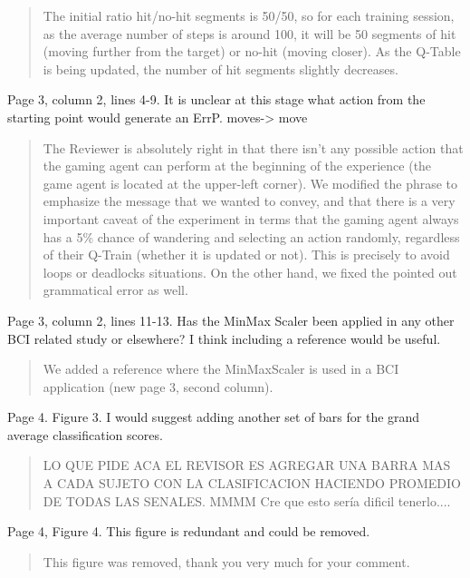 \documentclass[journal,onecolumn,12pt]{IEEEtran}
\begin{document}
\begin{quotation}
{\color{blue}
The initial ratio hit/no-hit segments is 50/50, so for each training session, as the average number of steps is around 100, it will be 50 segments of hit (moving further from the target) or no-hit (moving closer).  As the Q-Table is being updated, the number of hit segments slightly decreases.
}
\end{quotation}


Page 3, column 2, lines 4-9. It is unclear at this stage what action from the starting point would generate an ErrP.
moves-> move

\begin{quotation}
{\color{blue}
The Reviewer is absolutely right in that there isn't any possible action that the gaming agent can perform at the beginning of the experience (the game agent is located at the upper-left corner).  We modified the phrase to emphasize the message that we wanted to convey, and that there is a very important caveat of the experiment in terms that the gaming agent always has a 5\% chance of wandering and selecting an action randomly, regardless of their Q-Train (whether it is updated or not).  This is precisely to avoid loops or deadlocks situations.
On the other hand, we fixed the pointed out grammatical error as well.
}
\end{quotation}


Page 3, column 2, lines 11-13. Has the MinMax Scaler been applied in any other BCI related study or elsewhere? I think including a reference would be useful.

\begin{quotation}
{\color{blue}
We added a reference where the MinMaxScaler is used in a BCI application (new page 3, second column).
}
\end{quotation}

Page 4. Figure 3. I would suggest adding another set of bars for the grand average classification scores.

\begin{quotation}
{\color{blue}
LO QUE PIDE ACA EL REVISOR ES AGREGAR UNA BARRA MAS A CADA SUJETO CON LA CLASIFICACION HACIENDO PROMEDIO DE TODAS LAS SENALES.  MMMM Cre que esto sería dificil tenerlo....
}
\end{quotation}

Page 4, Figure 4. This figure is redundant and could be removed.

\begin{quotation}
{\color{blue}
This figure was removed, thank you very much for your comment.
}
\end{quotation}
\end{document}
